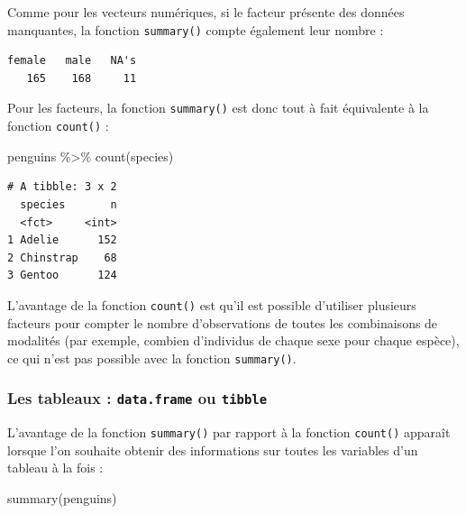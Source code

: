 \documentclass[
  a4paper,
  DIV=11,
  numbers=noendperiod,
  oneside]{scrreprt}
\newenvironment{Shaded}{}{}
\newcommand{\FunctionTok}[1]{\textcolor[rgb]{0.44,0.26,0.76}{#1}}
\newcommand{\NormalTok}[1]{\textcolor[rgb]{0.14,0.16,0.18}{#1}}
\newcommand{\SpecialCharTok}[1]{\textcolor[rgb]{0.00,0.36,0.77}{#1}}
\begin{document}
Comme pour les vecteurs numériques, si le facteur présente des données
manquantes, la fonction \texttt{summary()} compte également leur nombre
:

\begin{Shaded}
\end{Shaded}

\begin{verbatim}
female   male   NA's 
   165    168     11 
\end{verbatim}

Pour les facteurs, la fonction \texttt{summary()} est donc tout à fait
équivalente à la fonction \texttt{count()} :

\begin{Shaded}
\begin{Highlighting}[]
\NormalTok{penguins }\SpecialCharTok{\%\textgreater{}\%} 
  \FunctionTok{count}\NormalTok{(species)}
\end{Highlighting}
\end{Shaded}

\begin{verbatim}
# A tibble: 3 x 2
  species       n
  <fct>     <int>
1 Adelie      152
2 Chinstrap    68
3 Gentoo      124
\end{verbatim}

L'avantage de la fonction \texttt{count()} est qu'il est possible
d'utiliser plusieurs facteurs pour compter le nombre d'observations de
toutes les combinaisons de modalités (par exemple, combien d'individus
de chaque sexe pour chaque espèce), ce qui n'est pas possible avec la
fonction \texttt{summary()}.

\hypertarget{les-tableaux-data.frame-ou-tibble}{%
\subsubsection{\texorpdfstring{Les tableaux : \texttt{data.frame} ou
\texttt{tibble}}{Les tableaux : data.frame ou tibble}}\label{les-tableaux-data.frame-ou-tibble}}

L'avantage de la fonction \texttt{summary()} par rapport à la fonction
\texttt{count()} apparaît lorsque l'on souhaite obtenir des informations
sur toutes les variables d'un tableau à la fois :

\begin{Shaded}
\begin{Highlighting}[]
\FunctionTok{summary}\NormalTok{(penguins)}
\end{Highlighting}
\end{Shaded}
\end{document}
